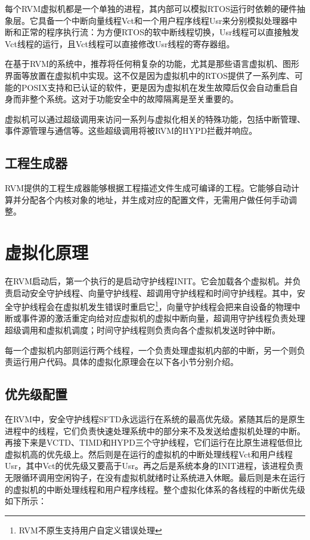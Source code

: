每个RVM虚拟机都是一个单独的进程，其内部可以模拟RTOS运行时依赖的硬件抽象层。它具备一个中断向量线程Vct和一个用户程序线程Usr来分别模拟处理器中断和正常的程序执行流：为方便RTOS的软中断线程切换，Usr线程可以直接触发Vct线程的运行，且Vct线程可以直接修改Usr线程的寄存器组。

在基于RVM的系统中，推荐将任何稍复杂的功能，尤其是那些语言虚拟机、图形界面等放置在虚拟机中实现。这不仅是因为虚拟机中的RTOS提供了一系列库、可能的POSIX支持和已认证的软件，更是因为虚拟机在发生故障后仅会自动重启自身而非整个系统。这对于功能安全中的故障隔离是至关重要的。

虚拟机可以通过超级调用来访问一系列与虚拟化相关的特殊功能，包括中断管理、事件源管理与通信等。这些超级调用将被RVM的HYPD拦截并响应。

\subsection{工程生成器}\label{subsec:2-1-4}

RVM提供的工程生成器能够根据工程描述文件生成可编译的工程。它能够自动计算并分配各个内核对象的地址，并生成对应的配置文件，无需用户做任何手动调整。

\section{虚拟化原理}\label{sec:2-2}

在RVM启动后，第一个执行的是启动守护线程INIT。它会加载各个虚拟机。并负责启动安全守护线程、向量守护线程、超调用守护线程和时间守护线程。其中，安全守护线程会在虚拟机发生错误时重启它\footnote{RVM不原生支持用户自定义错误处理}，向量守护线程会把来自设备的物理中断或事件源的激活重定向给对应虚拟机的虚拟中断向量，超调用守护线程负责处理超级调用和虚拟机调度；时间守护线程则负责向各个虚拟机发送时钟中断。

每一个虚拟机内部则运行两个线程，一个负责处理虚拟机内部的中断，另一个则负责运行用户代码。具体的虚拟化原理会在以下各小节分别介绍。

\subsection{优先级配置}\label{subsec:2-2-1}

在RVM中，安全守护线程SFTD永远运行在系统的最高优先级。紧随其后的是原生进程中的线程，它们负责快速处理系统中的部分来不及发送给虚拟机处理的中断。再接下来是VCTD、TIMD和HYPD三个守护线程，它们运行在比原生进程低但比虚拟机高的优先级上。然后则是在运行的虚拟机的中断处理线程Vct和用户线程Usr，其中Vct的优先级又要高于Usr。再之后是系统本身的INIT进程，该进程负责无限循环调用空闲钩子，在没有虚拟机就绪时让系统进入休眠。最后则是未在运行的虚拟机的中断处理线程和用户程序线程。整个虚拟化体系的各线程的中断优先级如下所示：


